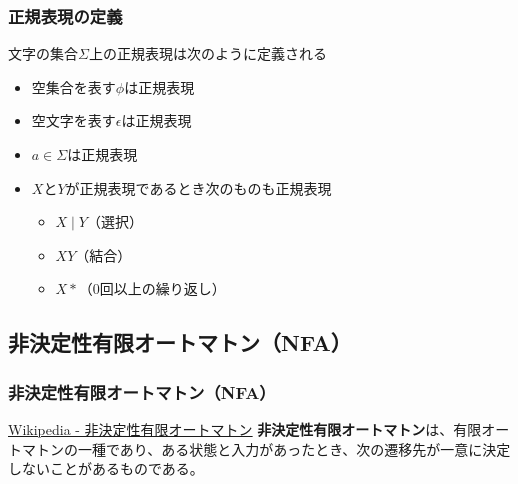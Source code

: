 \documentclass[12pt, unicode, svgnames]{beamer}
\begin{document}
\begin{frame}[fragile]
  \frametitle{正規表現の定義}

  文字の集合$\Sigma$上の正規表現は次のように定義される
  \begin{block}{}
    \begin{itemize}
      \item<2-> 空集合を表す$\phi$は正規表現
      \item<3-> 空文字を表す$\epsilon$は正規表現
      \item<4-> $a \in \Sigma$は正規表現
      \item<5-> $X$と$Y$が正規表現であるとき次のものも正規表現
        \begin{itemize}
          \item<6-> $X \mid Y$（選択）
          \item<7-> $X Y$（結合）
          \item<8-> $X *$（0回以上の繰り返し）
        \end{itemize}
    \end{itemize}
  \end{block}
\end{frame}

\subsection{非決定性有限オートマトン（NFA）}
\begin{frame}[fragile]
  \frametitle{非決定性有限オートマトン（NFA）}
  
  \begin{block}{}
    \begin{shadequote}[r]{\scriptsize\href{https://ja.wikipedia.org/wiki/\%E9\%9D\%9E\%E6\%B1\%BA\%E5\%AE\%9A\%E6\%80\%A7\%E6\%9C\%89\%E9\%99\%90\%E3\%82\%AA\%E3\%83\%BC\%E3\%83\%88\%E3\%83\%9E\%E3\%83\%88\%E3\%83\%B3}{Wikipedia - 非決定性有限オートマトン}}
      \textbf{非決定性有限オートマトン}は、有限オートマトンの一種であり、ある状態と入力があったとき、次の遷移先が一意に決定しないことがあるものである。
    \end{shadequote}
  \end{block}

\end{frame}
\end{document}
